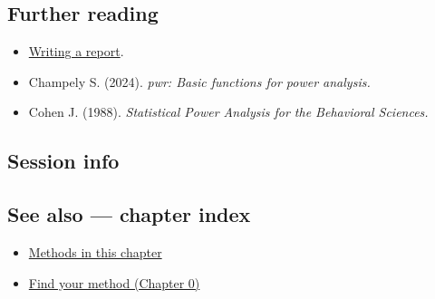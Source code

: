 \documentclass[
]{article}
\newenvironment{Shaded}{\begin{snugshade}}{\end{snugshade}}
\providecommand{\tightlist}{%
  \setlength{\itemsep}{0pt}\setlength{\parskip}{0pt}}
\begin{document}
\subsection{Further reading}\label{further-reading}

\begin{itemize}
\tightlist
\item
  \href{../../appendices/D-writing-a-report.Rmd}{Writing a report}.
\item
  Champely S. (2024). \emph{pwr: Basic functions for power analysis.}
\item
  Cohen J. (1988). \emph{Statistical Power Analysis for the Behavioral
  Sciences.}
\end{itemize}

\subsection{Session info}\label{session-info}

\begin{Shaded}
\begin{Highlighting}[]

\end{Highlighting}
\end{Shaded}

\subsection{See also --- chapter index}\label{see-also-chapter-index}

\begin{itemize}
\tightlist
\item
  \href{../index.Rmd}{Methods in this chapter}
\item
  \href{../../../ch00-find-your-method.Rmd}{Find your method (Chapter
  0)}
\end{itemize}
\end{document}
